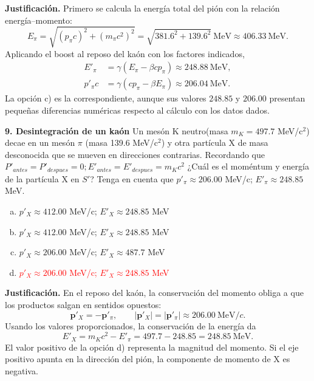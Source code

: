 \textbf{Justificación.} Primero se calcula la energía total del pión con la relación energía--momento:
\[
E_\pi=\sqrt{(p_\pi c)^2+(m_\pi c^2)^2}
=\sqrt{381.6^2+139.6^2}\ \mathrm{MeV}
\approx406.33\ \mathrm{MeV}.
\]
Aplicando el boost al reposo del kaón con los factores indicados,
\begin{align*}
E'_\pi&=\gamma(E_\pi-\beta cp_\pi)\approx248.88\ \mathrm{MeV},\\
p'_\pi c&=\gamma(cp_\pi-\beta E_\pi)\approx206.04\ \mathrm{MeV}.
\end{align*}
La opción c) es la correspondiente, aunque sus valores $248.85$ y $206.00$ presentan pequeñas diferencias numéricas respecto al cálculo con los datos dados.

\textbf{9. Desintegración de un kaón}
Un mesón K neutro(masa $m_K= 497.7$ MeV/c$^2$) decae en un mesón $\pi$ (masa 139.6 MeV/c$^2$) y otra partícula X de masa desconocida que se mueven en direcciones contrarias. Recordando que
$P'_{antes}= P'_{despues}= 0; E'_{antes}= E'_{despues}= m_K c^2$
¿Cuál es el moméntum y energía de la partícula X en $S'$? Tenga en cuenta que $p'_\pi \approx 206.00$ MeV/c; $E'_\pi \approx 248.85$ MeV.
\begin{enumerate}[a)]
    \item $p'_X \approx 412.00$ MeV/c; $E'_X \approx 248.85$ MeV
    \item $p'_X \approx 412.00$ MeV/c; $E'_X \approx 248.85$ MeV
    \item $p'_X \approx 206.00$ MeV/c; $E'_X \approx 487.7$ MeV
    \item \textcolor{red}{$p'_X \approx 206.00$ MeV/c; $E'_X \approx 248.85$ MeV}
\end{enumerate}

\textbf{Justificación.} En el reposo del kaón, la conservación del momento obliga a que los productos salgan en sentidos opuestos:
\[
\mathbf{p}'_X=-\mathbf{p}'_\pi,
\qquad |\mathbf{p}'_X|=|\mathbf{p}'_\pi|\approx206.00\ \mathrm{MeV}/c.
\]
Usando los valores proporcionados, la conservación de la energía da
\[
E'_X=m_Kc^2-E'_\pi=497.7-248.85=248.85\ \mathrm{MeV}.
\]
El valor positivo de la opción d) representa la magnitud del momento. Si el eje positivo apunta en la dirección del pión, la componente de momento de X es negativa.